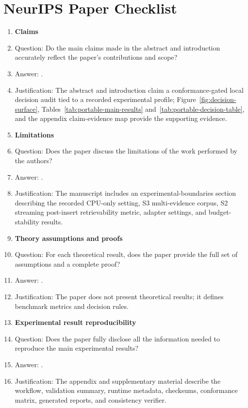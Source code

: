 \section*{NeurIPS Paper Checklist}

\begin{enumerate}

\item {\bf Claims}
    \item[] Question: Do the main claims made in the abstract and introduction accurately reflect the paper's contributions and scope?
    \item[] Answer: \answerYes{}.
    \item[] Justification: The abstract and introduction claim a conformance-gated local decision audit tied to a recorded experimental profile; Figure~\ref{fig:decision-surface}, Tables~\ref{tab:portable-main-results} and~\ref{tab:portable-decision-table}, and the appendix claim-evidence map provide the supporting evidence.

\item {\bf Limitations}
    \item[] Question: Does the paper discuss the limitations of the work performed by the authors?
    \item[] Answer: \answerYes{}.
    \item[] Justification: The manuscript includes an experimental-boundaries section describing the recorded CPU-only setting, S3 multi-evidence corpus, S2 streaming post-insert retrievability metric, adapter settings, and budget-stability results.

\item {\bf Theory assumptions and proofs}
    \item[] Question: For each theoretical result, does the paper provide the full set of assumptions and a complete proof?
    \item[] Answer: \answerNA{}.
    \item[] Justification: The paper does not present theoretical results; it defines benchmark metrics and decision rules.

\item {\bf Experimental result reproducibility}
    \item[] Question: Does the paper fully disclose all the information needed to reproduce the main experimental results?
    \item[] Answer: \answerYes{}.
    \item[] Justification: The appendix and supplementary material describe the workflow, validation summary, runtime metadata, checksums, conformance matrix, generated reports, and consistency verifier.


\end{enumerate}
